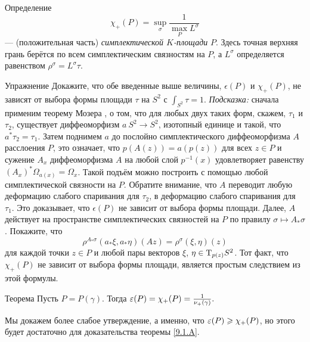 \begin{ex*}{Определение}
\[\chi_+ (P) = \sup_\sigma \frac1{\max_P L^\sigma}\]  — (положительная часть) \emph{симплектической $K$-площади} $P$.
Здесь точная верхняя грань берётся по всем симплектическим связностям на $P$, а $L^\sigma$ определяется равенством $\rho^\sigma = L^\sigma \tau$.
\end{ex*}

\begin{ex*}{Упражнение}
Докажите, что обе введенные выше величины, $\epsilon(P)$ и $\chi_+
(P)$, не зависят от выбора формы площади $\tau$ на $S^2$ с $\int_{S^2}
\tau = 1$. 
\emph{Подсказка:} сначала применим теорему Мозера \cite{MS}, о том, что для
любых двух таких форм, скажем, $\tau_1$ и $\tau_2$, существует
диффеоморфизм $a\:S^2\to S^2$, изотопный единице и такой, что $a^\ast
\tau_2 = \tau_1$.
Затем поднимем $a$ до послойно симплектического диффеоморфизма $A$ расслоения $P$, это означает, что $p(A(z)) = a(p(z))$ для всех $z \in P$ и сужение $A_x$ диффеоморфизма $A$ на любой слой $p^{-1} (x)$ удовлетворяет равенству $(A_x)^\ast \Omega_{a(x)} = \Omega_x$.
Такой подъём можно построить с помощью любой симплектической связности
на $P$. 
Обратите внимание, что $A$ переводит любую деформацию слабого
спаривания для $\tau_2$, в деформацию слабого спаривания для
$\tau_1$.
Это доказывает, что $\epsilon(P)$ не зависит от выбора формы площади.
Далее, $A$ действует на пространстве симплектических связностей на $P$
по правилу $\sigma \mapsto A_\ast \sigma$.
Покажите, что 
\[\rho^{A_\ast \sigma} (a_\ast \xi, a_\ast \eta)(Az) = \rho^\sigma (\xi, \eta)(z)\]
для каждой точки $z \in P$ и любой пары векторов $\xi$, $\eta \in
\mathrm{T}_{p(z)} S^2$.
Тот факт, что $\chi_+(P)$ не зависит от выбора формы площади, является
простым следствием из этой формулы.
\end{ex*}

\begin{thm}[(\cite{P4})]{Теорема}\label{9.3.B}
  Пусть $P = P(\gamma)$.
  Тогда $\epsilon(P) = \chi_+ (P) \z= \frac1{\nu_+(\gamma)}.$
\end{thm}

Мы докажем более слабое утверждение, а именно, что $\epsilon(P) \z\ge
\chi_+ (P)$, но этого будет достаточно для доказательства теоремы
\ref{9.1.A}.

